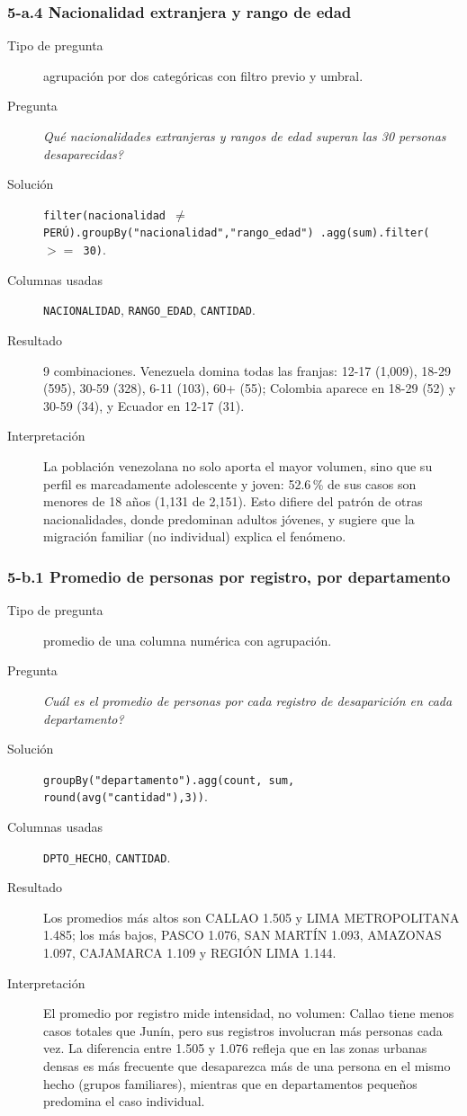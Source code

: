 \subsubsection*{5-a.4 \textbar{} Nacionalidad extranjera y rango de edad}
\begin{description}
\item[Tipo de pregunta] agrupaci\'on por dos categ\'oricas con filtro previo y umbral.
\item[Pregunta] \emph{Qu\'e nacionalidades extranjeras y rangos de edad superan las 30 personas
      desaparecidas?}
\item[Soluci\'on] \texttt{filter(nacionalidad $\neq$ PER\'U).groupBy("nacionalidad","rango\_edad")
      .agg(sum).filter($>=$ 30)}.
\item[Columnas usadas] \texttt{NACIONALIDAD}, \texttt{RANGO\_EDAD}, \texttt{CANTIDAD}.
\item[Resultado] 9 combinaciones. Venezuela domina todas las franjas: 12-17 (1,009), 18-29
      (595), 30-59 (328), 6-11 (103), 60+ (55); Colombia aparece en 18-29 (52) y 30-59 (34), y
      Ecuador en 12-17 (31).
\item[Interpretaci\'on] La poblaci\'on venezolana no solo aporta el mayor volumen, sino que su
      perfil es marcadamente adolescente y joven: 52.6\,\% de sus casos son menores de 18 a\~nos (1,131 de 2,151).
      Esto difiere del patr\'on de otras nacionalidades, donde predominan adultos j\'ovenes, y
      sugiere que la migraci\'on familiar (no individual) explica el fen\'omeno.
\end{description}

\subsubsection*{5-b.1 \textbar{} Promedio de personas por registro, por departamento}
\begin{description}
\item[Tipo de pregunta] promedio de una columna num\'erica con agrupaci\'on.
\item[Pregunta] \emph{Cu\'al es el promedio de personas por cada registro de desaparici\'on en
      cada departamento?}
\item[Soluci\'on] \texttt{groupBy("departamento").agg(count, sum, round(avg("cantidad"),3))}.
\item[Columnas usadas] \texttt{DPTO\_HECHO}, \texttt{CANTIDAD}.
\item[Resultado] Los promedios m\'as altos son CALLAO 1.505 y LIMA METROPOLITANA 1.485; los
      m\'as bajos, PASCO 1.076, SAN MART\'IN 1.093, AMAZONAS 1.097, CAJAMARCA 1.109 y REGI\'ON
      LIMA 1.144.
\item[Interpretaci\'on] El promedio por registro mide intensidad, no volumen: Callao tiene menos
      casos totales que Jun\'in, pero sus registros involucran m\'as personas cada vez. La
      diferencia entre 1.505 y 1.076 refleja que en las zonas urbanas densas es m\'as frecuente
      que desaparezca m\'as de una persona en el mismo hecho (grupos familiares), mientras que
      en departamentos peque\~nos predomina el caso individual.
\end{description}

